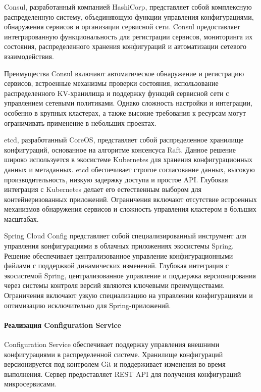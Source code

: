 Consul, разработанный компанией HashiCorp, представляет собой комплексную распределенную систему, объединяющую функции управления конфигурациями, обнаружения сервисов и организации сервисной сети. Consul предоставляет интегрированную функциональность для регистрации сервисов, мониторинга их состояния, распределенного хранения конфигураций и автоматизации сетевого взаимодействия.

Преимущества Consul включают автоматическое обнаружение и регистрацию сервисов, встроенные механизмы проверки состояния, использование распределенного KV-хранилища и поддержку функций сервисной сети с управлением сетевыми политиками. Однако сложность настройки и интеграции, особенно в крупных кластерах, а также высокие требования к ресурсам могут ограничивать применение в небольших проектах.

etcd, разработанный CoreOS, представляет собой распределенное хранилище конфигураций, основанное на алгоритме консенсуса Raft. Данное решение широко используется в экосистеме Kubernetes для хранения конфигурационных данных и метаданных.
etcd обеспечивает строгое согласование данных, высокую производительность, низкую задержку доступа и простое API. Глубокая интеграция с Kubernetes делает его естественным выбором для контейнеризованных приложений. Ограничения включают отсутствие встроенных механизмов обнаружения сервисов и сложность управления кластером в больших масштабах.

Spring Cloud Config представляет собой специализированный инструмент для управления конфигурациями в облачных приложениях экосистемы Spring. Решение обеспечивает централизованное управление конфигурационными файлами с поддержкой динамических изменений.
Глубокая интеграция с экосистемой Spring, централизованное управление и поддержка версионирования через системы контроля версий являются ключевыми преимуществами. Ограничения включают узкую специализацию на управлении конфигурациями и оптимизацию исключительно для Spring-приложений.

\paragraph{Реализация Configuration Service}

Configuration Service обеспечивает поддержку управления внешними конфигурациями в распределенной системе. Хранилище конфигураций версионируется под контролем Git и поддерживает изменения во время выполнения.
Сервер предоставляет REST API для получения конфигураций микросервисами.

